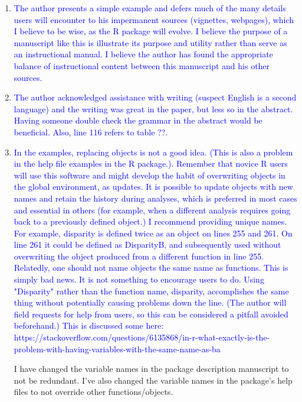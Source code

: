\documentclass[12pt,letterpaper]{article}
\begin{document}
\begin{enumerate}

\item{\textcolor{blue}{The author presents a simple example and defers much of the many details users will encounter to his impermanent sources (vignettes, webpages), which I believe to be wise, as the R package will evolve.  I believe the purpose of a manuscript like this is illustrate its purpose and utility rather than serve as an instructional manual.  I believe the author has found the appropriate balance of instructional content between this manuscript and his other sources.}}


\item{\textcolor{blue}{The author acknowledged assistance with writing (suspect English is a second language) and the writing was great in the paper, but less so in the abstract.  Having someone double check the grammar in the abstract would be beneficial.  Also, line 116 refers to table ??.}}

\item{\textcolor{blue}{In the examples, replacing objects is not a good idea.  (This is also a problem in the help file examples in the R package.).  Remember that novice R users will use this software and might develop the habit of overwriting objects in the global environment, as updates.  It is possible to update objects with new names and retain the history during analyses, which is preferred in most cases and essential in others (for example, when a different analysis requires going back to a previously defined object.)  I recommend providing unique names.  For example, disparity is defined twice as an object on lines 255 and 261.  On line 261 it could be defined as DisparityB, and subsequently used without overwriting the object produced from a different function in line 255. Relatedly, one should not name objects the same name as functions.  This is simply bad news.  It is not something to encourage users to do.  Using "Disparity" rather than the function name, disparity, accomplishes the same thing without potentially causing problems down the line.  (The author will field requests for help from users, so this can be considered a pitfall avoided beforehand.)  This is discussed some here: https://stackoverflow.com/questions/6135868/in-r-what-exactly-is-the-problem-with-having-variables-with-the-same-name-as-ba}}

I have changed the variable names in the package description manuscript to not be redundant.
I've also changed the variable names in the package's help files to not override other functions/objects.


\end{enumerate}
\end{document}
